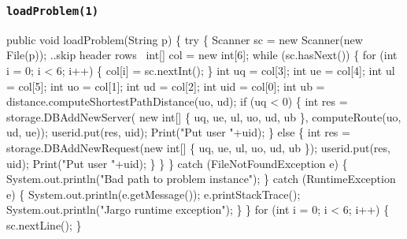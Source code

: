 \documentclass{article}
\def\nwendcode{\endtrivlist \endgroup}      %
\let\nwdocspar=\par
\begin{document}
\subsubsection{{\tt{}\protect{}loadProblem(1)}}
\nwenddocs{}\endmoddef{}
public void loadProblem(String p) \{
  try \{
    Scanner sc = new Scanner(new File(p));
    \LA{}..skip header rows~{\nwtagstyle{}}\RA{}
    int[] col = new int[6];
    while (sc.hasNext()) \{
      for (int i = 0; i < 6; i++) \{
        col[i] = sc.nextInt();
      \}
      int uq = col[3];
      int ue = col[4];
      int ul = col[5];
      int uo = col[1];
      int ud = col[2];
      int uid = col[0];
      int ub = distance.computeShortestPathDistance(uo, ud);
      if (uq < 0) \{
        int res = storage.DBAddNewServer(
            new int[] \{ uq, ue, ul, uo, ud, ub \}, computeRoute(uo, ud, ue));
        userid.put(res, uid);
        Print("Put user "+uid);
      \} else \{
        int res = storage.DBAddNewRequest(new int[] \{ uq, ue, ul, uo, ud, ub \});
        userid.put(res, uid);
        Print("Put user "+uid);
      \}
    \}
  \} catch (FileNotFoundException e) \{
    System.out.println("Bad path to problem instance");
  \} catch (RuntimeException e) \{
    System.out.println(e.getMessage());
    e.printStackTrace();
    System.out.println("Jargo runtime exception");
  \}
\}
\eatline
{}\nwendcode{}\endmoddef{}
for (int i = 0; i < 6; i++) \{
  sc.nextLine();
\}
\nwendcode{}\nwdocspar
\end{document}
